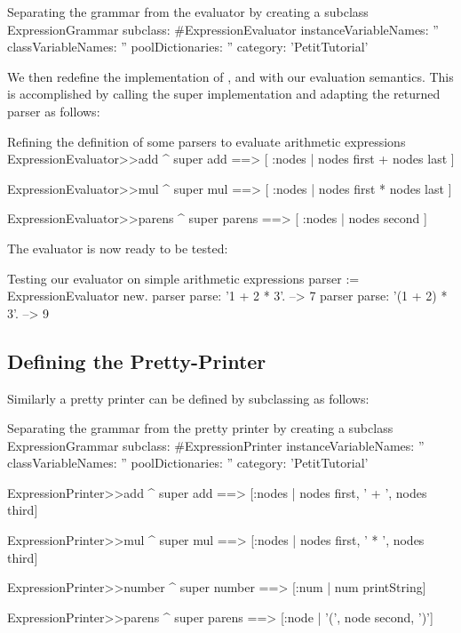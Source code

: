 \documentclass[a4paper,10pt,twoside]{book}
\begin{document}
\begin{script}{Separating the grammar from the evaluator by creating a subclass}
ExpressionGrammar subclass: #ExpressionEvaluator
   instanceVariableNames: ''
   classVariableNames: ''
   poolDictionaries: ''
   category: 'PetitTutorial'
\end{script}

We then redefine the implementation of ,  and
 with our evaluation semantics. This is accomplished by
calling the super implementation and adapting the returned parser as follows:

\begin{script}{Refining the definition of some parsers to evaluate arithmetic expressions}
ExpressionEvaluator>>add
   ^ super add ==> [ :nodes | nodes first + nodes last ]

ExpressionEvaluator>>mul
   ^ super mul ==> [ :nodes | nodes first * nodes last ]

ExpressionEvaluator>>parens
   ^ super parens ==> [ :nodes | nodes second ]
\end{script}

The evaluator is now ready to be tested:

\begin{script}{Testing our evaluator on simple arithmetic expressions}
parser := ExpressionEvaluator new.
parser parse: '1 + 2 * 3'.       --> 7
parser parse: '(1 + 2) * 3'.     --> 9
\end{script}

\subsection{Defining the Pretty-Printer}

Similarly a pretty printer can be defined by subclassing
 as follows:

\begin{script}{Separating the grammar from the pretty printer by creating a subclass}
ExpressionGrammar subclass: #ExpressionPrinter
  instanceVariableNames: ''
  classVariableNames: ''
  poolDictionaries: ''
  category: 'PetitTutorial'

ExpressionPrinter>>add
  ^ super add ==> [:nodes | nodes first, ' + ', nodes third]

ExpressionPrinter>>mul
  ^ super mul ==> [:nodes | nodes first, ' * ', nodes third]

ExpressionPrinter>>number
  ^ super number ==> [:num | num printString]

ExpressionPrinter>>parens
  ^ super parens ==> [:node | '(', node second, ')']
\end{script}
\end{document}
